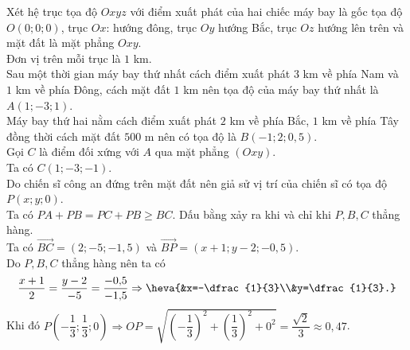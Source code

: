 \begin{bt}
{\begin{center}
		\end{center}
		Xét hệ trục tọa  độ $Oxyz$ với điểm xuất phát của hai chiếc máy bay là gốc tọa độ $O(0; 0; 0)$, trục $Ox$: hướng đông, trục $Oy$ hướng Bắc, trục $Oz$ hướng lên trên và mặt đất là mặt phẳng $Oxy$.\\
		Đơn vị trên  mỗi trục là $1$ km.\\
		Sau một thời gian máy bay thứ nhất cách điểm xuất phát $3$ km về phía Nam và $1$ km về phía Đông, cách  mặt đất $1$ km nên tọa độ của máy bay thứ nhất là $A (1; -3; 1)$.\\
		Máy bay thứ hai nằm cách điểm xuất phát $2$ km về phía Bắc, $1$ km về phía Tây đồng thời cách mặt đất $500$ m nên  có tọa độ là $B (-1; 2; 0{,}5)$.\\
		Gọi $C$ là điểm đối xứng với $A$ qua mặt phẳng $(Oxy)$.\\ 
		Ta có  $C(1; -3; -1)$.\\
		Do chiến sĩ công an đứng trên mặt đất  nên giả sử vị trí của chiến sĩ có tọa độ $P(x; y; 0)$.\\
		Ta có  $PA+PB=PC+PB\ge BC$. Dấu bằng xảy ra khi và chỉ khi $P, B, C$ thẳng hàng.\\
		Ta có $\overrightarrow{BC}=(2; -5; -1{,}5)$ và $\overrightarrow{BP}=(x+1; y-2; -0{,}5)$.\\ 
		Do $P, B, C$ thẳng hàng nên ta có 
		\begin{align*}
			 \dfrac{x+1}{2}=\dfrac{y-2}{-5}=\dfrac{-0{,}5}{-1{,}5}\Rightarrow\heva{&x=-\dfrac{1}{3}\\&y=\dfrac{1}{3}.}
		\end{align*}
		Khi đó $P\left(-\dfrac{1}{3}; \dfrac{1}{3}; 0\right)\Rightarrow  OP=\sqrt{\left(-\dfrac{1}{3}\right)^2+\left(\dfrac{1}{3}\right)^2+0^2}=\dfrac{\sqrt{2}}{3}\approx0{,}47$.
	 }
\end{bt}

